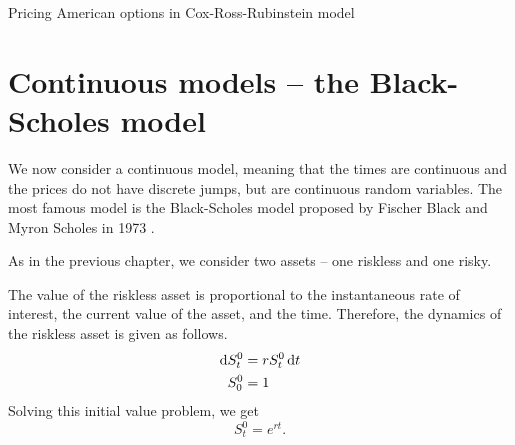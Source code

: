 \begin{algorithm}[H]
	\DontPrintSemicolon
	
	
	
	
	\caption{Pricing American options in Cox-Ross-Rubinstein model}
	\label{alg:discrete-am}
\end{algorithm}






\section{Continuous models -- the Black-Scholes model}
\label{sec:continuous}

We now consider a continuous model, meaning that the times are continuous and the prices do not have discrete jumps, but are continuous random variables. The most famous model is the Black-Scholes model proposed by Fischer Black and Myron Scholes in 1973 \cite{Black1973}.

As in the previous chapter, we consider two assets -- one riskless and one risky.

The value of the riskless asset is proportional to the instantaneous rate of interest, the current value of the asset, and the time. Therefore, the dynamics of the riskless asset is given as follows.
\begin{align}
	\label{eq:continous-riskless-de}
	\dif S_t^0  &=  r S_t^0 \dif t  \\
	S_0^0  &=  1
\end{align}
Solving this initial value problem, we get
\begin{equation}
	\label{eq:continous-riskless-int}
	S_t^0 = e^{rt}.
\end{equation}


